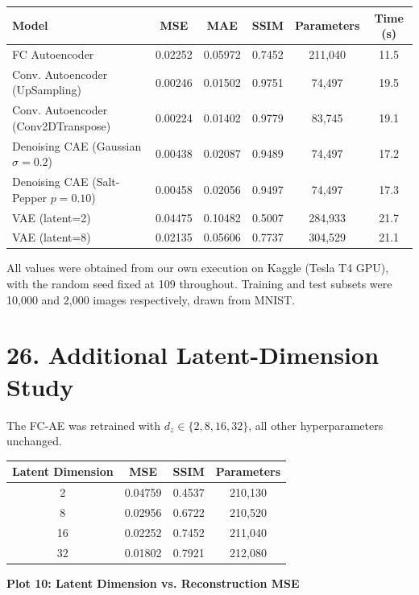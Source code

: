 \documentclass[10pt]{article}
\begin{document}
\begin{center}
\begin{tabular}{|l|c|c|c|c|c|}
\hline
Model & MSE & MAE & SSIM & Parameters & Time (s)\\
\hline
FC Autoencoder & 0.02252 & 0.05972 & 0.7452 & 211{,}040 & 11.5\\
Conv. Autoencoder (UpSampling) & 0.00246 & 0.01502 & 0.9751 & 74{,}497 & 19.5\\
Conv. Autoencoder (Conv2DTranspose) & 0.00224 & 0.01402 & 0.9779 & 83{,}745 & 19.1\\
Denoising CAE (Gaussian $\sigma=0.2$) & 0.00438 & 0.02087 & 0.9489 & 74{,}497 & 17.2\\
Denoising CAE (Salt-Pepper $p=0.10$) & 0.00458 & 0.02056 & 0.9497 & 74{,}497 & 17.3\\
VAE (latent=2) & 0.04475 & 0.10482 & 0.5007 & 284{,}933 & 21.7\\
VAE (latent=8) & 0.02135 & 0.05606 & 0.7737 & 304{,}529 & 21.1\\
\hline
\end{tabular}
\end{center}

All values were obtained from our own execution on Kaggle (Tesla T4 GPU), with the random seed fixed at 109 throughout. Training and test subsets were 10,000 and 2,000 images respectively, drawn from MNIST.


\section*{26. Additional Latent-Dimension Study}

The FC-AE was retrained with $d_z \in \{2, 8, 16, 32\}$, all other hyperparameters unchanged.

\begin{center}
\begin{tabular}{|c|c|c|c|}
\hline
Latent Dimension & MSE & SSIM & Parameters\\
\hline
2 & 0.04759 & 0.4537 & 210{,}130\\
8 & 0.02956 & 0.6722 & 210{,}520\\
16 & 0.02252 & 0.7452 & 211{,}040\\
32 & 0.01802 & 0.7921 & 212{,}080\\
\hline
\end{tabular}
\end{center}

\textbf{Plot 10: Latent Dimension vs. Reconstruction MSE}
\end{document}

